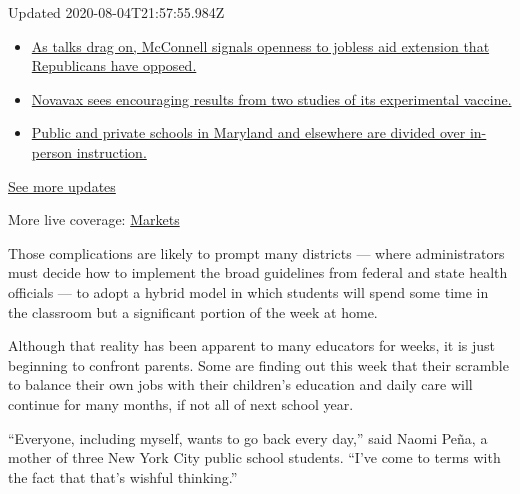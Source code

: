 Updated 2020-08-04T21:57:55.984Z

\begin{itemize}
\tightlist
\item
  \href{https://www.nytimes3xbfgragh.onion/2020/08/04/world/coronavirus-cases.html?action=click\&pgtype=Article\&state=default\&region=MAIN_CONTENT_1\&context=storylines_live_updates\#link-2daa96b5}{As
  talks drag on, McConnell signals openness to jobless aid extension
  that Republicans have opposed.}
\item
  \href{https://www.nytimes3xbfgragh.onion/2020/08/04/world/coronavirus-cases.html?action=click\&pgtype=Article\&state=default\&region=MAIN_CONTENT_1\&context=storylines_live_updates\#link-1228a480}{Novavax
  sees encouraging results from two studies of its experimental
  vaccine.}
\item
  \href{https://www.nytimes3xbfgragh.onion/2020/08/04/world/coronavirus-cases.html?action=click\&pgtype=Article\&state=default\&region=MAIN_CONTENT_1\&context=storylines_live_updates\#link-4825b93}{Public
  and private schools in Maryland and elsewhere are divided over
  in-person instruction.}
\end{itemize}

\href{https://www.nytimes3xbfgragh.onion/2020/08/04/world/coronavirus-cases.html?action=click\&pgtype=Article\&state=default\&region=MAIN_CONTENT_1\&context=storylines_live_updates}{See
more updates}

More live coverage:
\href{https://www.nytimes3xbfgragh.onion/live/2020/08/04/business/stock-market-today-coronavirus?action=click\&pgtype=Article\&state=default\&region=MAIN_CONTENT_1\&context=storylines_live_updates}{Markets}

Those complications are likely to prompt many districts --- where
administrators must decide how to implement the broad guidelines from
federal and state health officials --- to adopt a hybrid model in which
students will spend some time in the classroom but a significant portion
of the week at home.

Although that reality has been apparent to many educators for weeks, it
is just beginning to confront parents. Some are finding out this week
that their scramble to balance their own jobs with their children's
education and daily care will continue for many months, if not all of
next school year.

``Everyone, including myself, wants to go back every day,'' said Naomi
Peña, a mother of three New York City public school students. ``I've
come to terms with the fact that that's wishful thinking.''

